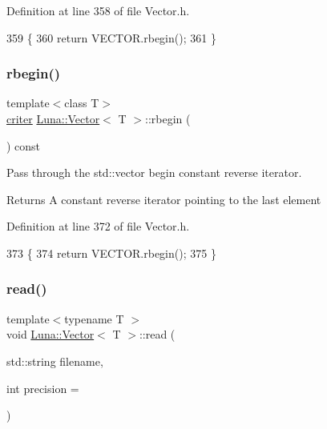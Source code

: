 Definition at line 358 of file Vector.\+h.


\begin{DoxyCode}
359     \{
360       \textcolor{keywordflow}{return} VECTOR.rbegin();
361     \}
\end{DoxyCode}
\mbox{\label{classLuna_1_1Vector_a62b4a362a308d2348c2d035c0d245f0c}} 
\subsubsection{\texorpdfstring{rbegin()}{rbegin()}\hspace{0.1cm}{\footnotesize\ttfamily [2/2]}}
{\footnotesize\ttfamily template$<$class T$>$ \\
\hyperlink{classLuna_1_1Vector_a66e997f05169640055703449672be075}{criter} \hyperlink{classLuna_1_1Vector}{Luna\+::\+Vector}$<$ T $>$\+::rbegin (\begin{DoxyParamCaption}{ }\end{DoxyParamCaption}) const\hspace{0.3cm}{\ttfamily [inline]}}



Pass through the std\+::vector begin constant reverse iterator. 

\begin{DoxyReturn}{Returns}
A constant reverse iterator pointing to the last element 
\end{DoxyReturn}


Definition at line 372 of file Vector.\+h.


\begin{DoxyCode}
373     \{
374       \textcolor{keywordflow}{return} VECTOR.rbegin();
375     \}
\end{DoxyCode}
\mbox{\label{classLuna_1_1Vector_ac88b73bb16a6052fb68a8994ce2c7e94}} 
\subsubsection{\texorpdfstring{read()}{read()}}
{\footnotesize\ttfamily template$<$typename T $>$ \\
void \hyperlink{classLuna_1_1Vector}{Luna\+::\+Vector}$<$ T $>$\+::read (\begin{DoxyParamCaption}\item[{std\+::string}]{filename,  }\item[{int}]{precision = {} }\end{DoxyParamCaption})\hspace{0.3cm}{\ttfamily [inline]}}



